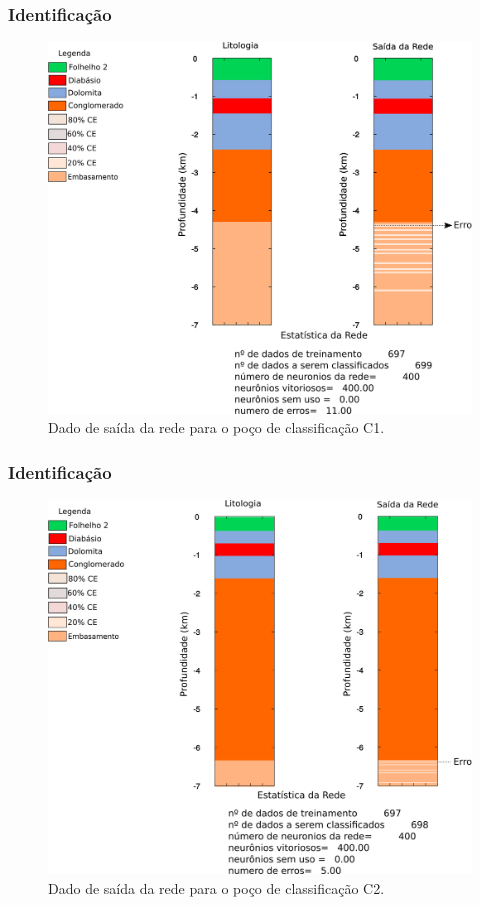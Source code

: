 \documentclass[aspectratio=10]{beamer} %
\begin{document}
\begin{frame}
\frametitle{Identificação}
\begin{figure}[H]
\centering
\includegraphics[scale=0.45]{Imagens/IDC1.png}
\caption{Dado de saída da rede para o poço de classificação C1.}
\label{Class C1}
\end{figure} 
\end{frame}

\begin{frame}
\frametitle{Identificação}
\begin{figure}[H]
\centering
\includegraphics[scale=0.45]{Imagens/IDC2.png}
\caption{Dado de saída da rede para o poço de classificação C2.}
\label{Class C2}
\end{figure} 
\end{frame}
\end{document}

